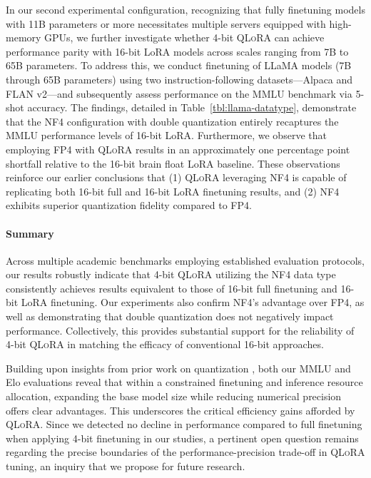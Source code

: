 In our second experimental configuration, recognizing that fully finetuning models with 11B parameters or more necessitates multiple servers equipped with high-memory GPUs, we further investigate whether 4-bit \textsc{QLoRA} can achieve performance parity with 16-bit LoRA models across scales ranging from 7B to 65B parameters. To address this, we conduct finetuning of LLaMA models (7B through 65B parameters) using two instruction-following datasets—Alpaca and FLAN v2—and subsequently assess performance on the MMLU benchmark via 5-shot accuracy. The findings, detailed in Table~\ref{tbl:llama-datatype}, demonstrate that the NF4 configuration with double quantization entirely recaptures the MMLU performance levels of 16-bit LoRA. Furthermore, we observe that employing FP4 with \textsc{QLoRA} results in an approximately one percentage point shortfall relative to the 16-bit brain float LoRA baseline. These observations reinforce our earlier conclusions that (1) \textsc{QLoRA} leveraging NF4 is capable of replicating both 16-bit full and 16-bit LoRA finetuning results, and (2) NF4 exhibits superior quantization fidelity compared to FP4.

\paragraph{Summary} Across multiple academic benchmarks employing established evaluation protocols, our results robustly indicate that 4-bit \textsc{QLoRA} utilizing the NF4 data type consistently achieves results equivalent to those of 16-bit full finetuning and 16-bit LoRA finetuning. Our experiments also confirm NF4's advantage over FP4, as well as demonstrating that double quantization does not negatively impact performance. Collectively, this provides substantial support for the reliability of 4-bit \textsc{QLoRA} in matching the efficacy of conventional 16-bit approaches.

Building upon insights from prior work on quantization \citep{dettmers2022case}, both our MMLU and Elo evaluations reveal that within a constrained finetuning and inference resource allocation, expanding the base model size while reducing numerical precision offers clear advantages. This underscores the critical efficiency gains afforded by \textsc{QLoRA}. Since we detected no decline in performance compared to full finetuning when applying 4-bit finetuning in our studies, a pertinent open question remains regarding the precise boundaries of the performance-precision trade-off in \textsc{QLoRA} tuning, an inquiry that we propose for future research.


